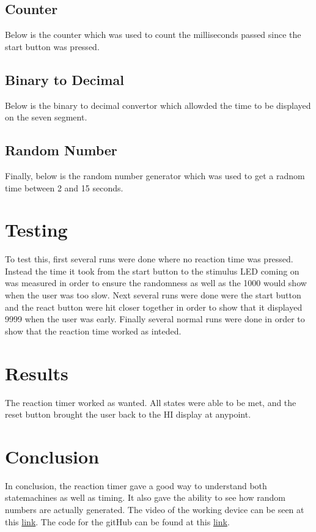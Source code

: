 \documentclass[12pt]{article}
\newcommand{\Verilog}[2][]{%
	
}
\begin{document}
\subsection{Counter}
Below is the counter which was used to count the milliseconds passed since the start button was pressed.
\Verilog[firstline=23]{./count_up.sv}
\subsection{Binary to Decimal}
Below is the binary to decimal convertor which allowded the time to be displayed on the seven segment. 
\Verilog[firstline=23]{./bin_2_bcd.sv}
\subsection{Random Number}
Finally, below is the random number generator which was used to get a radnom time between 2 and 15 seconds. 

\section{Testing}
To test this, first several runs were done where no reaction time was pressed. Instead the time it took from the start button to the stimulus LED coming on was measured in order to ensure the randomness as well as the 1000 would show when the user was too slow. Next several runs were done were the start button and the react button were hit closer together in order to show that it displayed 9999 when the user was early. Finally several normal runs were done in order to show that the reaction time worked as inteded. 


\section{Results}
The reaction timer worked as wanted. All states were able to be met, and the reset button brought the user back to the HI display at anypoint.

\section{Conclusion}
In conclusion, the reaction timer gave a good way to understand both statemachines as well as timing. It also gave the ability to see how random numbers are actually generated. The video of the working device can be seen at this \href{https://www.youtube.com/watch?v=ml-7Efxw5FM}{link}. 
The code for the gitHub can be found at this \href {https://github.com/andrew-clinkenbeard/Reaction-Timer} {link}.
\end{document}
